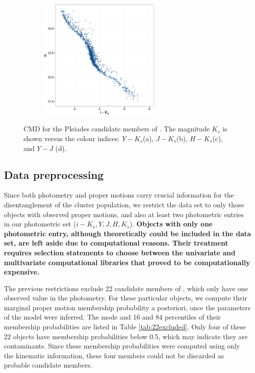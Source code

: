 \begin{figure}[ht!]
\begin{subfigure}[t]{0.45\textwidth}
      \includegraphics[page=5,height=6cm]{background/Figures/CIs.pdf}
        \caption{}
        \label{} 
    \end{subfigure}
    \caption{CMD for the Pleiades candidate members of \citet{Bouy2015}. The magnitude $K_s$ is shown versus the colour indices: $Y-K_s$(a), $J-K_s$(b), $H-K_s$(c), and $Y-J$ (d).}
    \label{fig:otherCI}
\end{figure}


\subsection{Data preprocessing}
\label{sect:RDR2}
Since both photometry and proper motions carry crucial information for the disentanglement of the cluster population, we restrict the data set to only those objects with observed proper motions, and also at least two photometric entries in our photometric set ($i-K_s,Y,J,H,K_s$). \textbf{Objects with only one photometric entry, although theoretically could be included in the data set, are left aside due to computational reasons. Their treatment requires selection statements to choose between the univariate and multivariate computational libraries that proved to be computationally expensive.}

The previous restrictions exclude 22 candidate members of \citet{Bouy2015}, which only have one observed value in the photometry. For these particular objects, we compute their marginal proper motion membership probability a posteriori, once the parameters of the model were inferred. The mode and 16 and 84 percentiles of their membership probabilities are listed in Table \ref{tab:22excluded}. Only four of these 22 objects have membership probabilities below 0.5, which may indicate they are contaminants. Since these membership probabilities were computed using only the kinematic information, these four members could not be discarded as probable candidate members.

